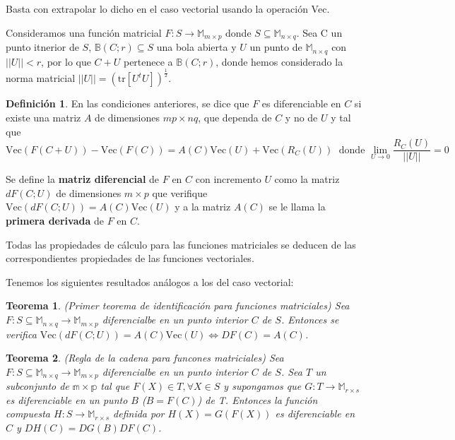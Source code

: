 \documentclass{article}
\theoremstyle{theorem-style}  %
\newtheorem{theorem}{Teorema}[section]  %
\theoremstyle{definition}
\newtheorem{definition}{Definición}[section]
\theoremstyle{example-style}
\begin{document}
Basta con extrapolar lo dicho en el caso vectorial usando la operación Vec.

Consideramos una función matricial $F: S \rightarrow \mathbb{M}_{m\times p}$ donde $S \subseteq \mathbb{M}_{n\times q}$. Sea C un punto itnerior de $S$, $\mathbb{B}(C;r) \subseteq S$ una bola abierta y $U$ un punto de $\mathbb{M}_{n\times q}$ con $||U||<r$, por lo que $C+U$ pertenece a $\mathbb{B}(C;r)$, donde hemos considerado la norma matricial $||U||=(\text{tr}[U^tU])^{\frac{1}{2}}$.

\begin{definition}
	En las condiciones anteriores, se dice que $F$ es diferenciable en $C$ si existe una matriz $A$ de dimensiones $mp\times nq$, que dependa de $C$ y no de $U$ y tal que
	$$\text{Vec}(F(C+U))-\text{Vec}(F(C))=A(C)\text{Vec}(U)+\text{Vec}(R_C(U))\; \text{ donde } \lim\limits_{U\rightarrow 0} \frac{R_C(U)}{||U||} = 0$$
	
	Se define la \textbf{matriz diferencial} de $F$ en $C$ con incremento $U$ como la matriz $dF(C;U)$ de dimensiones $m\times p$ que verifique $\text{Vec}(dF(C;U))=A(C)\text{Vec}(U)$ y a la matriz $A(C)$ se le llama la \textbf{primera derivada} de $F$ en $C$.
\end{definition}

Todas las propiedades de cálculo para las funciones matriciales se deducen de las correspondientes propiedades de las funciones vectoriales.

Tenemos los siguientes resultados análogos a los del caso vectorial:

\begin{theorem} (Primer teorema de identificación para funciones matriciales)
	Sea $F:S\subseteq \mathbb{M}_{n \times q}\rightarrow \mathbb{M}_{m \times p}$ diferencialbe en un punto interior $C$ de $S$. Entonces se verifica $\text{Vec}(dF(C;U))=A(C)\text{Vec}(U) \Leftrightarrow DF(C)=A(C)$.	
\end{theorem}

\begin{theorem} (Regla de la cadena para funcones matriciales)
	Sea $F:S\subseteq \mathbb{M}_{n \times q}\rightarrow \mathbb{M}_{m \times p}$ diferencialbe en un punto interior $C$ de $S$. Sea $T$ un subconjunto de $\mathbb{m\times p}$ tal que $F(X)\in T, \forall X\in S$ y supongamos que $G:T\rightarrow \mathbb{M}_{r\times s}$ es diferenciable en un punto $B$ ($B=F(C)$) de T. Entonces la función compuesta $H:S\rightarrow \mathbb{M}_{r\times s}$ definida por $H(X)=G(F(X))$ es diferenciable en $C$ y $DH(C)=DG(B)DF(C)$.
\end{theorem}
\end{document}
